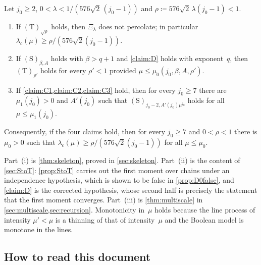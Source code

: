 \documentclass[11pt,letterpaper]{article}
\begin{document}
\begin{theorem}
\label{thm:main}
Let $j_0\ge2$, $0<\lambda<1/(576\sqrt2\,(j_0-1))$ and $\rho\coloneqq576\sqrt2\,\lambda(j_0-1)<1$.
\begin{enumerate}
  \item[\emph{(i)}] If $\mathrm{(T)}_{\sqrt\rho}$ holds, then $\Xi_\lambda$ does not percolate; in particular $\lambda_c(\mu)\ge\rho/(576\sqrt2(j_0-1))$.
  \item[\emph{(ii)}] If $\mathrm{(S)}_{\beta,A}$ holds with $\beta>q+1$ and \cref{claim:D} holds with exponent~$q$, then $\mathrm{(T)}_{\rho'}$ holds for every $\rho'<1$ provided $\mu\le\mu_0(j_0,\beta,A,\rho')$.
  \item[\emph{(iii)}] If \cref{claim:C1,claim:C2,claim:C3} hold, then for every $j_0\ge7$ there are $\mu_1(j_0)>0$ and $A'(j_0)$ such that $\mathrm{(S)}_{j_0-2,A'(j_0)\mu^{j_0}}$ holds for all $\mu\le\mu_1(j_0)$.
\end{enumerate}
Consequently, if the four claims hold, then for every $j_0\ge7$ and $0<\rho<1$ there is $\mu_0>0$ such that $\lambda_c(\mu)\ge\rho/(576\sqrt2(j_0-1))$ for all $\mu\le\mu_0$.
\end{theorem}

Part~(i) is \cref{thm:skeleton}, proved in \cref{sec:skeleton}. Part~(ii) is the content of \cref{sec:StoT}: \cref{prop:StoT} carries out the first moment over chains under an independence hypothesis, which is shown to be false in \cref{prop:D0false}, and \cref{claim:D} is the corrected hypothesis, whose second half is precisely the statement that the first moment converges. Part~(iii) is \cref{thm:multiscale} in \cref{sec:multiscale,sec:recursion}. Monotonicity in~$\mu$ holds because the line process of intensity $\mu'<\mu$ is a thinning of that of intensity~$\mu$ and the Boolean model is monotone in the lines.

\subsection{How to read this document}
\end{document}
